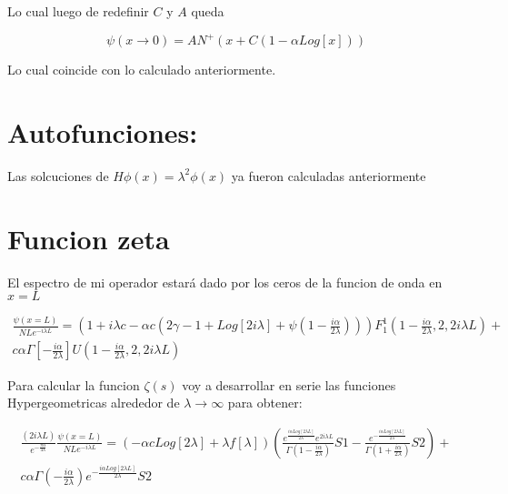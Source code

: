 Lo cual luego de redefinir $C$ y $A$ queda 

\begin{equation}
\psi (x \rightarrow 0 ) = A N ^{+} 
\left(
x + C (1- \alpha Log[x] )
\right)
\end{equation}

Lo cual coincide con lo calculado anteriormente.

\section{Autofunciones:}

Las solcuciones de $H \phi (x) = \lambda ^2 \phi (x)$ ya fueron calculadas anteriormente 

\section{Funcion zeta}

El espectro de mi operador estará dado por los ceros de la funcion de onda en $x=L$

\begin{equation}
\begin{array}{c}
\frac{\psi (x=L)}{N L e ^{-i \lambda L} }
 = 
\left(
1+ i \lambda c - \alpha c 
\left(
2 \gamma -1 + Log[2 i \lambda] + 
\psi 
( 1 - \frac{i \alpha}{2 \lambda} )
\right)  
\right)
F _1 ^1 (1 - \frac{i \alpha}{2 \lambda},2,2 i \lambda L ) + \\
c \alpha \Gamma [-\frac{i \alpha}{2 \lambda}]
U (1 - \frac{i \alpha}{2 \lambda},2,2 i \lambda L )
\end{array}
\end{equation}

Para calcular la funcion $\zeta (s)$ voy a desarrollar en serie las funciones Hypergeometricas alrededor de $\lambda \rightarrow \infty$ para obtener:

\begin{equation}
\begin{array}{c}
\frac{(2 i \lambda L)}
{e ^{- \frac{\pi \alpha}{4 \lambda}}}
 \frac{\psi (x=L)}{N L e ^{-i \lambda L} } = 
 (- \alpha c Log[2 \lambda] + \lambda f[ \lambda ] ) 
 \left(
 \frac{e ^{  \frac{i \alpha Log[2 \lambda L ]}{2 \lambda } } e ^{2 i \lambda L } }
 {\Gamma ( 1 - \frac{i \alpha}{2 \lambda} )} S1 - 
 \frac{e ^{ -  \frac{i \alpha Log[2 \lambda L ]}{2 \lambda } } }
 	  {\Gamma (1 + \frac{i \alpha}{2 \lambda})} S2 
 \right) + \\
 c \alpha \Gamma (-\frac{i \alpha}{2 \lambda}) 
 e ^{- \frac{i \alpha Log[2 \lambda L]}{2 \lambda}} S2
\end{array}
\end{equation}

